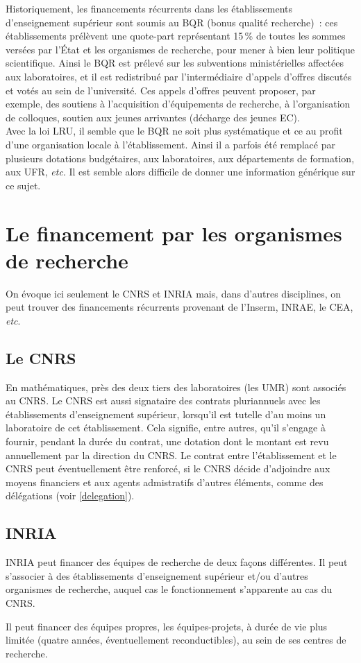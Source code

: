 Historiquement, les financements r\'ecurrents dans les \'etablissements d'enseignement
sup\'erieur sont soumis au BQR (bonus qualit\'e recherche)~: ces
\'etablissements pr\'el\`event une quote-part repr\'esentant 15\,\% de
toutes les sommes vers\'ees par l'\'Etat et les organismes de
recherche, pour mener \`a bien leur politique scientifique.
Ainsi le BQR est pr\'elev\'e sur les subventions
minist\'erielles affect\'ees aux laboratoires, et il est redistribu\'e par
l'interm\'ediaire d'appels d'offres discut\'es et vot\'es au sein de l'universit\'e. 
Ces appels d'offres peuvent
proposer, par exemple, des soutiens \`a l'acquisition d'\'equipements de recherche,
\`a l'organisation de colloques, soutien aux jeunes arrivant\mp e\mp s (d\'echarge des jeunes EC).\\

Avec la loi LRU, il semble que le BQR ne soit plus systématique et ce au profit d'une organisation locale à l'établissement.
Ainsi il a parfois été remplacé par plusieurs dotations budgétaires, aux laboratoires, aux départements de formation, aux UFR, {\em etc}.
Il est semble alors difficile de donner une information générique sur ce sujet.

\section{Le financement par les organismes de recherche}

On \'evoque ici seulement le CNRS et INRIA mais, dans d'autres disciplines, on peut trouver des financements r\'ecurrents provenant de l'Inserm, INRAE, le CEA, {\em etc}.

\subsection{Le CNRS}


En math\'ematiques, pr\`es des deux tiers des laboratoires (les UMR)
sont associ\'es au CNRS. Le CNRS est aussi signataire des contrats pluriannuels avec les
\'etablissements d'enseignement su\-p\'e\-rieur, lorsqu'il est
tutelle d'au moins un laboratoire de cet \'etablissement. Cela
signifie, entre autres, qu'il s'engage \`a fournir, pendant la
dur\'ee du contrat, une dotation dont le montant est revu
annuellement par la direction du CNRS. Le contrat entre l'\'etablissement et le CNRS peut \'eventuellement
\^etre renforc\'e, si le CNRS d\'ecide d'adjoindre aux moyens
financiers et aux agents admistratifs d'autres \'el\'ements, comme des
d\'el\'egations (voir \ref{delegation}).

\subsection{INRIA}

INRIA peut financer des \'equipes de recherche de deux fa\c cons
diff\'erentes. Il peut s'associer \`a des \'etablissements d'enseignement
sup\'erieur et/ou d'autres organismes de recherche, auquel cas le
fonctionnement s'apparente au cas du CNRS.

Il peut financer des \'equipes propres, les \'equipes-projets, \`a dur\'ee
de vie plus limit\'ee (quatre ann\'ees, \'eventuel\-le\-ment
reconductibles), au sein de ses centres de recherche.